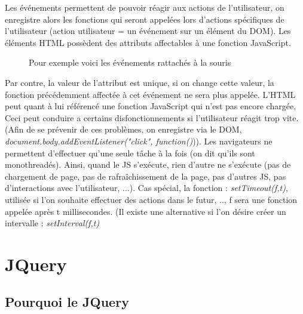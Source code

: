 \documentclass{article}[12pt]
\begin{document}
Les événements 	permettent de pouvoir réagir aux actions de l'utilisateur, on enregistre alors les fonctions qui seront appelées lors d'actions spécifiques de l'utilisateur (action utilisateur = un événement sur un élément du DOM).
\newline
\newline
Les éléments HTML possèdent des attributs affectables à une fonction JavaScript.
\begin{figure}[H]
	\centering
    \caption{Pour exemple voici les événements rattachés à la souris}
\end{figure}
 Par contre, la valeur de l'attribut est unique, si on change cette valeur, la fonction précédemment affectée à cet événement ne sera plus appelée. L'HTML peut quant à lui référencé une fonction JavaScript qui n'est pas encore chargée, Ceci peut conduire a certains disfonctionnements si l'utilisateur réagit trop vite. (Afin de se prévenir de ces problèmes, on enregistre via le DOM, \emph{document.body.addEventListener("click", function(){}})).
\newline
\newline
Les navigateurs ne permettent d'effectuer qu'une seule tâche à la fois (on dit qu'ils sont monothreadés). Ainsi, quand le JS s'exécute, rien d'autre ne s'exécute (pas de chargement de page, pas de rafraîchissement de la page, pas d'autres JS, pas d'interactions avec l'utilisateur, ...).
\newline
\newline
Cas spécial, la fonction : \emph{setTimeout(f,t)}, utilisée si l'on souhaite effectuer des actions dans le futur, .., f sera une fonction appelée après t millisecondes. (Il existe une alternative si l'on désire créer un intervalle : \emph{setInterval(f,t)}

\section{JQuery}

\subsection{Pourquoi le JQuery}
\end{document}
